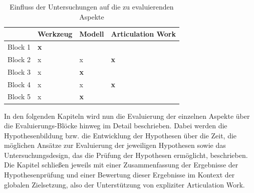 \begin{table}[htbp]
	\centering
	\caption{Einfluss der Untersuchungen auf die zu evaluierenden Aspekte}
	\begin{tabular}{| p{3cm} || p{2cm} | p{2cm} | p{2cm} |} \hline
		 & Werkzeug & Modell & Articulation Work \\ \hline \hline
		 Block 1 & \textbf{x} &  &   \\ \hline
		 Block 2 & x & x & \textbf{x}  \\ \hline
		 Block 3 & x & \textbf{x} &   \\ \hline
		 Block 4 & x & x & \textbf{x}  \\ \hline
		 Block 5 & x & \textbf{x} &   \\ \hline
	\end{tabular}
	\label{tab:evaluierungsMatrix}
\end{table}

In den folgenden Kapiteln wird nun die Evaluierung der einzelnen Aspekte über die Evaluierungs-Blöcke hinweg im Detail beschrieben. Dabei werden die Hypothesenbildung bzw. die Entwicklung der Hypothesen über die Zeit, die möglichen Ansätze zur Evaluierung der jeweiligen Hypothesen sowie das Untersuchungsdesign, das die Prüfung der Hypothesen ermöglicht, beschrieben. Die Kapitel schließen jeweils mit einer Zusammenfassung der Ergebnisse der Hypothesenprüfung und einer Bewertung dieser Ergebnisse im Kontext der globalen Zielsetzung, also der Unterstützung von expliziter Articulation Work.

